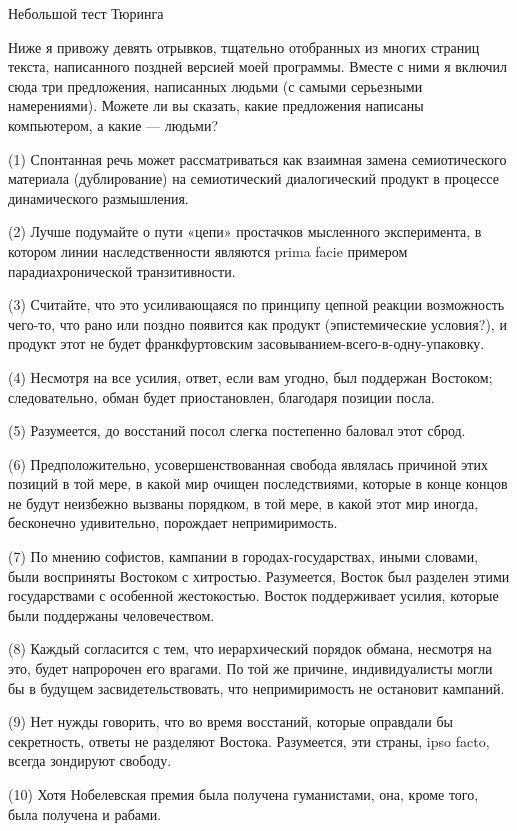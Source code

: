 Небольшой тест Тюринга

Ниже я привожу девять отрывков, тщательно отобранных из многих страниц текста, написанного поздней версией моей программы. Вместе с ними я включил сюда три предложения, написанных людьми (с самыми серьезными намерениями). Можете ли вы сказать, какие предложения написаны компьютером, а какие --- людьми?

(1) Спонтанная речь может рассматриваться как взаимная замена семиотического материала (дублирование) на семиотический диалогический продукт в процессе динамического размышления.

(2) Лучше подумайте о пути «цепи» простачков мысленного эксперимента, в котором линии наследственности являются prima facie примером парадиахронической транзитивности.

(3) Считайте, что это усиливающаяся по принципу цепной реакции возможность чего-то, что рано или поздно появится как продукт (эпистемические условия?), и продукт этот не будет франкфуртовским засовыванием-всего-в-одну-упаковку.

(4) Несмотря на все усилия, ответ, если вам угодно, был поддержан Востоком; следовательно, обман будет приостановлен, благодаря позиции посла.

(5) Разумеется, до восстаний посол слегка постепенно баловал этот сброд.

(6) Предположительно, усовершенствованная свобода являлась причиной этих позиций в той мере, в какой мир очищен последствиями, которые в конце концов не будут неизбежно вызваны порядком, в той мере, в какой этот мир иногда, бесконечно удивительно, порождает непримиримость.

(7) По мнению софистов, кампании в городах-государствах, иными словами, были восприняты Востоком с хитростью. Разумеется, Восток был разделен этими государствами с особенной жестокостью. Восток поддерживает усилия, которые были поддержаны человечеством.

(8) Каждый согласится с тем, что иерархический порядок обмана, несмотря на это, будет напророчен его врагами. По той же причине, индивидуалисты могли бы в будущем засвидетельствовать, что непримиримость не остановит кампаний.

(9) Нет нужды говорить, что во время восстаний, которые оправдали бы секретность, ответы не разделяют Востока. Разумеется, эти страны, ipso facto, всегда зондируют свободу.

(10) Хотя Нобелевская премия была получена гуманистами, она, кроме того, была получена и рабами.


